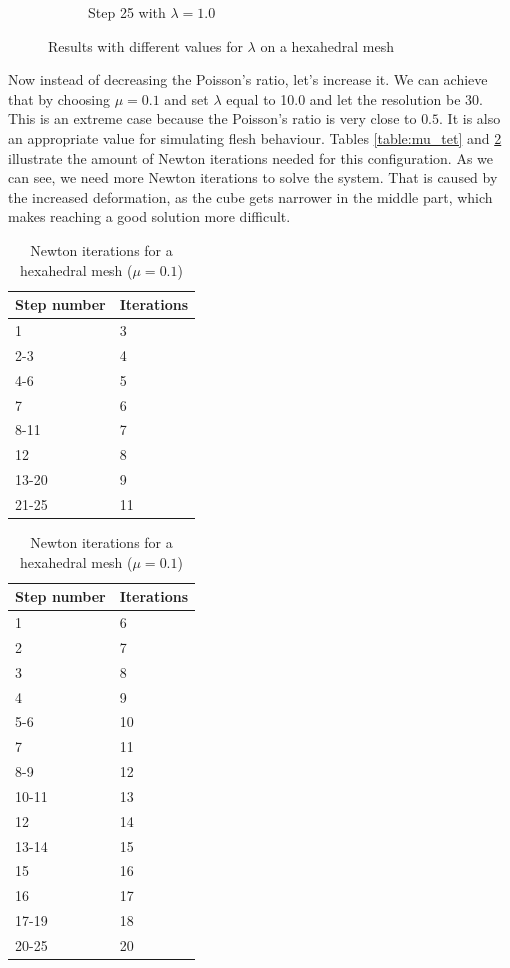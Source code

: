 \begin{figure}[!ht]
\begin{subfigure}{.47\textwidth}
  \caption{Step 25 with $\lambda = 1.0$}
  \label{fig:lambda_2}
\end{subfigure}
\caption{Results with different values for $\lambda$ on a hexahedral mesh}
\label{fig:lambda}
\end{figure}

Now instead of decreasing the Poisson's ratio, let's increase it. We can achieve that by choosing $\mu = 0.1$ and set $\lambda$ equal to 10.0 and let the resolution be 30. This is an extreme case because the Poisson's ratio is very close to $0.5$. It is also an appropriate value for simulating flesh behaviour. Tables \ref{table:mu_tet} and \ref{table:mu_hex} illustrate the amount of Newton iterations needed for this configuration. As we can see, we need more Newton iterations to solve the system. That is caused by the increased deformation, as the cube gets narrower in the middle part, which makes reaching a good solution more difficult.

\begin{table}[!htbp]
\parbox{.45\linewidth}{
\centering
\begin{tabular}{ | l | l |}
\hline
\textbf{Step number} & \textbf{Iterations} \\ \hline
1 & 3 \\ \hline
2-3 & 4 \\ \hline
4-6 & 5 \\ \hline
7 & 6 \\ \hline
8-11 & 7 \\ \hline
12 & 8 \\ \hline
13-20 & 9 \\ \hline
21-25 & 11 \\ \hline
\end{tabular}
\caption{Newton iterations for a tetrahedral mesh ($\mu = 0.1$)}
\label{table:mu_tet}
}
\hfill
\parbox{.45\linewidth}{
\centering
\begin{tabular}{ | l | l |}
\hline
\textbf{Step number} & \textbf{Iterations} \\ \hline
1 & 6 \\ \hline
2 & 7 \\ \hline
3 & 8 \\ \hline
4 & 9 \\ \hline
5-6 & 10 \\ \hline
7 & 11 \\ \hline
8-9 & 12 \\ \hline
10-11 & 13 \\ \hline
12 & 14 \\ \hline
13-14 & 15 \\ \hline
15 & 16 \\ \hline
16 & 17 \\ \hline
17-19 & 18 \\ \hline
20-25 & 20 \\ \hline
\end{tabular}
\caption{Newton iterations for a hexahedral mesh ($\mu = 0.1$)}
\label{table:mu_hex}
}
\end{table}


